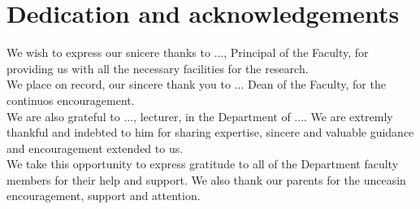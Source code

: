 
\chapter*{Dedication and acknowledgements}
\begin{SingleSpace}
We wish to express our snicere thanks to ..., Principal of the Faculty, for
providing us with all the necessary facilities for the research.
\\

We place on record, our sincere thank you to ... Dean of the Faculty, for the
continuos encouragement.
\\

We are also grateful to ..., lecturer, in the Department of .... We are extremly
thankful and indebted to him for sharing expertise, sincere and valuable
guidance and encouragement extended to us.
\\

We take this opportunity to express gratitude to all of the Department faculty
members for their help and support. We also thank our parents for the unceasin
encouragement, support and attention.

 \end{SingleSpace} \clearpage